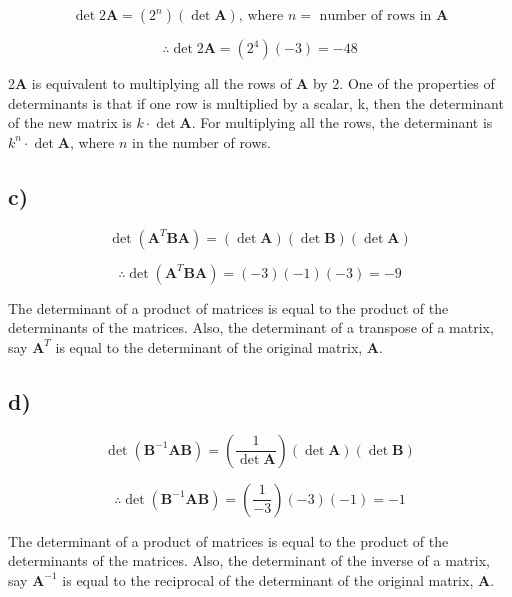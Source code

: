 \documentclass[12pt, a4paper]{article}
\begin{document}
\[
    \det 2\boldsymbol{A} = (2^n) (\det\boldsymbol{A}) \text{, where } n = \text{ number of rows in } \boldsymbol{A}
\]

\[
    \therefore \det 2\boldsymbol{A} = (2^4)(-3) = -48
\]

2$\boldsymbol{A}$ is equivalent to multiplying all the rows of $\boldsymbol{A}$ by 2. One of the properties of determinants is that if one row is multiplied by a scalar, k, then the determinant of the new matrix is $k \cdot \det\boldsymbol{A}$. For multiplying all the rows, the determinant is $k^n \cdot \det\boldsymbol{A}$, where $n$ in the number of rows.

\subsection*{c)}

\[
    \det(\boldsymbol{A}^T\boldsymbol{BA}) = (\det\boldsymbol{A})(\det\boldsymbol{B})(\det\boldsymbol{A})
\]

\[
    \therefore \det(\boldsymbol{A}^T\boldsymbol{BA}) = (-3)(-1)(-3) = -9
\]

The determinant of a product of matrices is equal to the product of the determinants of the matrices. Also, the determinant of a transpose of a matrix, say $\boldsymbol{A}^T$ is equal to the determinant of the original matrix, $\boldsymbol{A}$.

\subsection*{d)}

\[
    \det(\boldsymbol{B}^{-1}\boldsymbol{AB}) = \left(\frac{1}{\det\boldsymbol{A}}\right)(\det\boldsymbol{A})(\det\boldsymbol{B})
\]

\[
    \therefore \det(\boldsymbol{B}^{-1}\boldsymbol{AB}) = \left(\frac{1}{-3}\right)(-3)(-1) = -1
\]

The determinant of a product of matrices is equal to the product of the determinants of the matrices. Also, the determinant of the inverse of a matrix, say $\boldsymbol{A}^{-1}$ is equal to the reciprocal of the determinant of the original matrix, $\boldsymbol{A}$.
\end{document}
